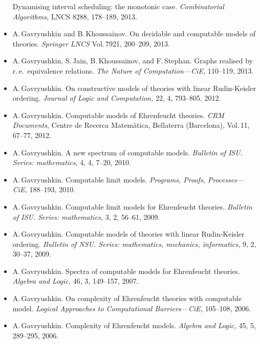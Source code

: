 \documentclass[12pt]{article}
\begin{document}
\begin{itemize}
	Dynamising interval scheduling: the monotonic case.
	{\em Combinatorial Algorithms,} LNCS 8288, 178--189, 2013.
\item A.\,Gavryushkin and B.\,Khoussainov.
	On decidable and computable models of theories.
	{\em Springer LNCS} Vol.\,7921, 200--209, 2013.
\item A.\,Gavryushkin, S.\,Jain, B.\,Khoussainov, and F.\,Stephan.
	Graphs realised by r.\,e.\ equivalence relations.
	{\em The Nature of Computation---CiE,} 110--119, 2013.	
\item A.\,Gavryushkin.
	On constructive models of theories with linear Rudin-Keisler ordering.
	{\em Journal of Logic and Computation,} 22, 4, 793--805, 2012.
\item A.\,Gavryushkin.
	Computable models of Ehrenfeucht theories.
	{\em CRM Documents}, Centre de Recerca Matem\`atica, Bellaterra (Barcelona), Vol.\,11, 67--77, 2012.
\item A.\,Gavryushkin.
	A new spectrum of computable models.
	{\em Bulletin of ISU.
	Series: mathematics,} 4, 4, 7--20, 2010.
\item A.\,Gavryushkin.
	Computable limit models.
	{\em Programs, Proofs, Processes---CiE,} 188--193, 2010.
\item A.\,Gavryushkin.
	Computable limit models for Ehrenfeucht theories.
	{\em Bulletin of ISU.
	Series: mathematics,} 3, 2, 56--61, 2009.
\item A.\,Gavryushkin.
	Computable models of theories with linear Rudin-Keisler ordering.
	{\em Bulletin of NSU.
	Series: mathematics, mechanics, informatics,} 9, 2, 30--37, 2009.
\item A.\,Gavryushkin.
	Spectra of computable models for Ehrenfeucht theories.
	{\em Algebra and Logic,} 46, 3, 149--157, 2007.
\item A.\,Gavryushkin.
	On complexity of Ehrenfeucht theories with computable model.
	{\em Logical Approaches to Computational Barriers---CiE,} 105--108, 2006.
\item A.\,Gavryushkin.
	Complexity of Ehrenfeucht models.
	{\em Algebra and Logic,} 45, 5, 289--295, 2006.
\end{itemize}
\end{document}
